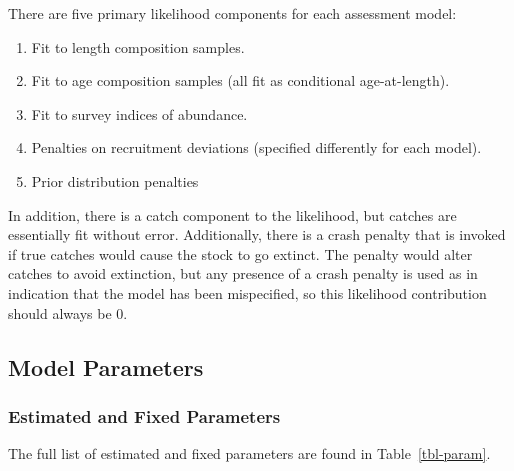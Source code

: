 \documentclass[
]{scrartcl}
\providecommand{\tightlist}{%
  \setlength{\itemsep}{0pt}\setlength{\parskip}{0pt}}\usepackage{longtable,booktabs,array}
\begin{document}
There are five primary likelihood components for each assessment model:

\begin{enumerate}
\def\labelenumi{\arabic{enumi}.}
\tightlist
\item
  Fit to length composition samples.
\item
  Fit to age composition samples (all fit as conditional age-at-length).
\item
  Fit to survey indices of abundance.
\item
  Penalties on recruitment deviations (specified differently for each
  model).
\item
  Prior distribution penalties
\end{enumerate}

In addition, there is a catch component to the likelihood, but catches
are essentially fit without error. Additionally, there is a crash
penalty that is invoked if true catches would cause the stock to go
extinct. The penalty would alter catches to avoid extinction, but any
presence of a crash penalty is used as in indication that the model has
been mispecified, so this likelihood contribution should always be 0.

\subsection{Model Parameters}\label{model-parameters}

\subsubsection{Estimated and Fixed
Parameters}\label{estimated-and-fixed-parameters}

The full list of estimated and fixed parameters are found in
Table~\ref{tbl-param}.
\end{document}
